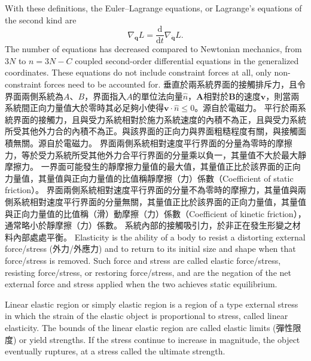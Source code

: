 \documentclass[a4paper,12pt]{article}
\begin{document}
With these definitions, the Euler–Lagrange equations, or Lagrange's equations of the second kind are
\[\nabla_{\mathbf{q}}L=\frac{\mathrm{d}}{\mathrm{d}t}\nabla_{\dot{\mathbf{q}}}L.\]
The number of equations has decreased compared to Newtonian mechanics, from $3N$ to $n = 3N − C$ coupled second-order differential equations in the generalized coordinates. These equations do not include constraint forces at all, only non-constraint forces need to be accounted for.
垂直於兩系統界面的接觸排斥力，且令界面兩側系統為$A$、$B$，界面指入$A$的單位法向量$\hat{n}$，$\mathbf{A}$相對於$\mathbf{B}$的速度$\mathbf{v}$，則當兩系統間正向力量值大於零時其必足夠小使得$\mathbf{v}\cdot\hat{n}\leq 0$。源自於電磁力。
平行於兩系統界面的接觸力，且與受力系統相對於施力系統速度的內積不為正，且與受力系統所受其他外力合的內積不為正。與該界面的正向力與界面粗糙程度有關，與接觸面積無關。源自於電磁力。
界面兩側系統相對速度平行界面的分量為零時的摩擦力，等於受力系統所受其他外力合平行界面的分量乘以負一，其量值不大於最大靜摩擦力。
一界面可能發生的靜摩擦力量值的最大值，其量值正比於該界面的正向力量值，其量值與正向力量值的比值稱靜摩擦（力）係數（Coefficient of static friction）。
界面兩側系統相對速度平行界面的分量不為零時的摩擦力，其量值與兩側系統相對速度平行界面的分量無關，其量值正比於該界面的正向力量值，其量值與正向力量值的比值稱（滑）動摩擦（力）係數（Coefficient of kinetic friction），通常略小於靜摩擦（力）係數。
系統內部的接觸吸引力，於非正在發生形變之材料內部處處平衡。
Elasticity is the ability of a body to resist a distorting external force/stress (外力/外應力) and to return to its initial size and shape when that force/stress is removed. Such force and stress are called elastic force/stress, resisting force/stress, or restoring force/stress, and are the negation of the net external force and stress applied when the two achieves static equilibrium.

Linear elastic region or simply elastic region is a region of a type external stress in which the strain of the elastic object is proportional to stress, called linear elasticity. The bounds of the linear elastic region are called elastic limits (彈性限度) or yield strengths. If the stress continue to increase in magnitude, the object eventually ruptures, at a stress called the ultimate strength.
\end{document}
